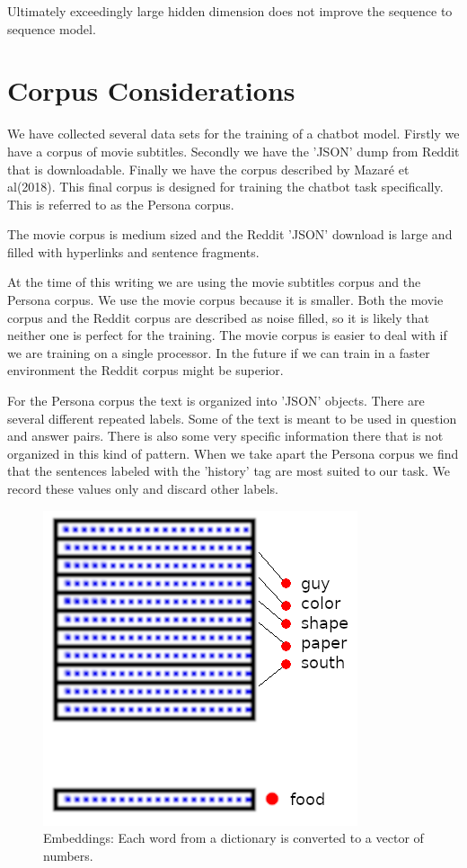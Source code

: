 Ultimately exceedingly large hidden dimension does not improve the
sequence to sequence model. 



\section{Corpus Considerations}
We have collected several data sets for the training of a chatbot model. Firstly we have a corpus of movie subtitles.
Secondly we have the 'JSON' dump from Reddit that is downloadable. Finally
we have the corpus described by Mazar{\'{e}} et al(2018)\cite{DBLP:journals/corr/abs-1809-01984}.
This final corpus is designed for training the chatbot task specifically. This is 
referred to as the Persona corpus.

The movie corpus is medium sized and the Reddit 'JSON' download is large
and filled with hyperlinks and sentence fragments. 

At the time of
this writing we are using the movie subtitles corpus and the Persona corpus. We use the movie
corpus because it is smaller. Both the movie corpus and the Reddit
corpus are described as noise filled, so it is likely that neither
one is perfect for the training. The movie corpus is easier to deal
with if we are training on a single processor. In the future if we
can train in a faster environment the Reddit corpus might be superior.

For the Persona corpus the text is organized into 'JSON' objects. There
are several different repeated labels. Some of the text is meant to be used in question and answer pairs. There is also some very specific information there that is not
organized in this kind of pattern. When we take apart the Persona corpus
we find that the sentences labeled with the 'history' tag are most suited to our task.
We record these values only and discard other labels.

\begin{figure}[H]
	
	\includegraphics[scale=1.0]{diagram-embedding}
	
	\caption[Word Embeddings]{Embeddings: Each word from a dictionary is converted to a vector of numbers.}
	
\end{figure}

